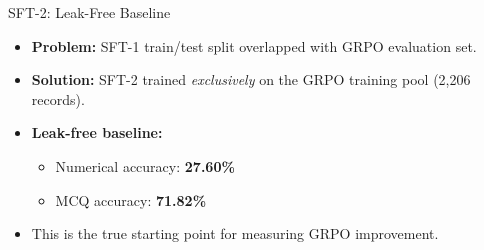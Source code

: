\documentclass[10pt]{beamer}
\begin{document}
\begin{frame}{SFT-2: Leak-Free Baseline}
\large
\begin{itemize}
    \item \textbf{Problem:} SFT-1 train/test split overlapped with GRPO evaluation set.
    \vspace{0.2cm}
    \item \textbf{Solution:} SFT-2 trained \emph{exclusively} on the GRPO training pool (2,206 records).
    \vspace{0.2cm}
    \item \textbf{Leak-free baseline:}
    \begin{itemize}
        \item Numerical accuracy: \textbf{27.60\%}
        \item MCQ accuracy: \textbf{71.82\%}
    \end{itemize}
    \vspace{0.2cm}
    \item This is the true starting point for measuring GRPO improvement.
\end{itemize}
\end{frame}
\end{document}

